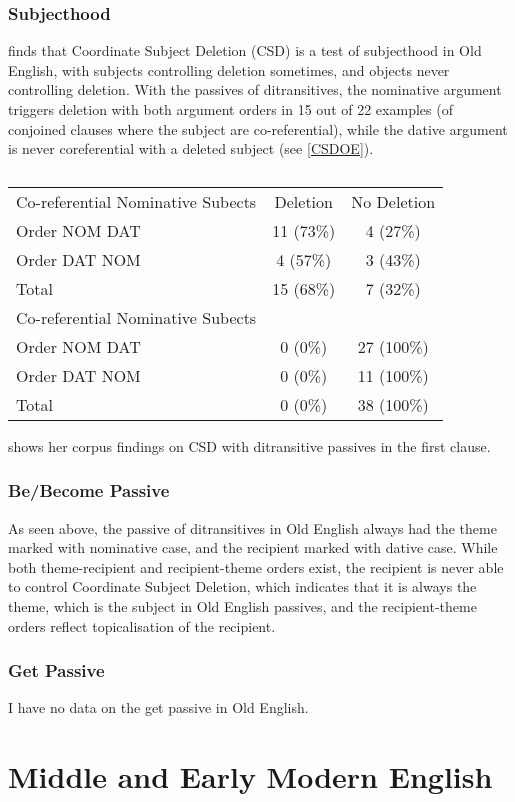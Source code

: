 \subsubsection{Subjecthood}
\cite[50-54]{Allen.1999} finds that Coordinate Subject Deletion (CSD) is a test of subjecthood in Old English, with subjects controlling deletion sometimes, and objects never controlling deletion. With the passives of ditransitives, the nominative argument triggers deletion with both argument orders in 15 out of 22 examples (of conjoined clauses where the subject are co-referential), while the dative argument is never coreferential with a deleted subject (see \autoref{CSDOE}).
\begin{table}[ht!]
\begin{tabular}{lcc}
Co-referential Nominative Subects & Deletion & No Deletion\\
Order NOM DAT & 11 (73\%) & 4 (27\%)\\
Order DAT NOM & 4 (57\%) & 3 (43\%)\\
Total & 15 (68\%) & 7 (32\%) \\
\hline
Co-referential Nominative Subects & & \\
Order NOM DAT & 0 (0\%) & 27 (100\%)\\
Order DAT NOM  & 0 (0\%) & 11 (100\%)\\
Total & 0 (0\%) & 38 (100\%)\\
\end{tabular}
\caption {\cite[Table 2.6]{Allen.1999}} shows her corpus findings on CSD with ditransitive passives in the first clause.
\label{tab:CSDOE}
\end{table}
\subsubsection{Be/Become Passive}
As seen above, the passive of ditransitives in Old English always had the theme marked with nominative case, and the recipient marked with dative case. While both theme-recipient and recipient-theme orders exist, the recipient is never able to control Coordinate Subject Deletion, which indicates that it is always the theme, which is the subject in Old English passives, and the recipient-theme orders reflect topicalisation of the recipient.
\subsubsection{Get Passive}
I have no data on the get passive in Old English.
\section{Middle and Early Modern English}
